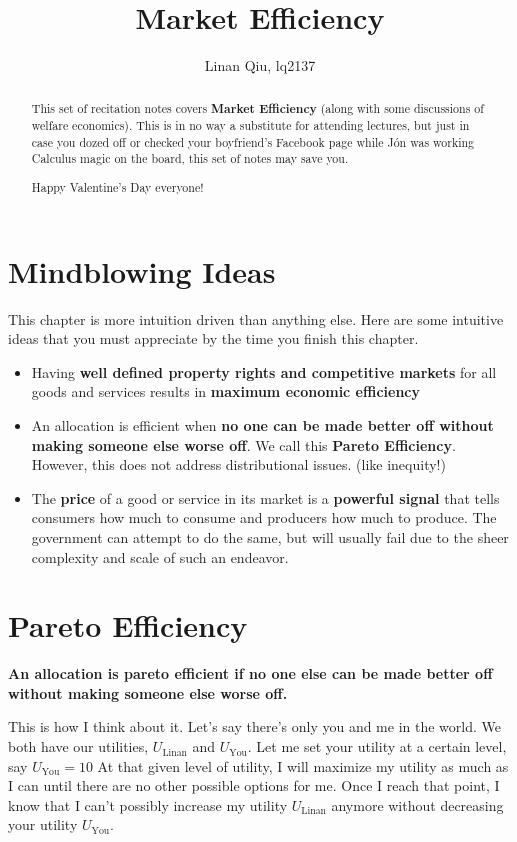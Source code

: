 \documentclass[11pt]{scrartcl}
\title{Market Efficiency}
\author{Linan Qiu, lq2137}
\newcommand{\jon}{Jón }
\begin{document}
\maketitle

\begin{abstract}
This set of recitation notes covers \textbf{Market Efficiency} (along with some discussions of welfare economics). This is in no way a substitute for attending lectures, but just in case you dozed off or checked your boyfriend's Facebook page while \jon was working Calculus magic on the board, this set of notes may save you.

Happy Valentine's Day everyone!
\end{abstract}

\section{Mindblowing Ideas}
This chapter is more intuition driven than anything else. Here are some intuitive ideas that you must appreciate by the time you finish this chapter.

\begin{itemize}
\item Having \textbf{well defined property rights and competitive markets} for all goods and services results in \textbf{maximum economic efficiency}
\item An allocation is efficient when \textbf{no one can be made better off without making someone else worse off}. We call this \textbf{Pareto Efficiency}. However, this does not address distributional issues. (like inequity!)
\item The \textbf{price} of a good or service in its market is a \textbf{powerful signal} that tells consumers how much to consume and producers how much to produce. The government can attempt to do the same, but will usually fail due to the sheer complexity and scale of such an endeavor.
\end{itemize}

\section{Pareto Efficiency}

\textbf{An allocation is pareto efficient if no one else can be made better off without making someone else worse off.} 

This is how I think about it. Let's say there's only you and me in the world. We both have our utilities, $U_{\mathrm{Linan}}$ and $U_{\mathrm{You}}$. Let me set your utility at a certain level, say $U_{\mathrm{You}} = 10$ At that given level of utility, I will maximize my utility as much as I can until there are no other possible options for me. Once I reach that point, I know that I can't possibly increase my utility $U_{\mathrm{Linan}}$ anymore without decreasing your utility $U_{\mathrm{You}}$.
\end{document}
